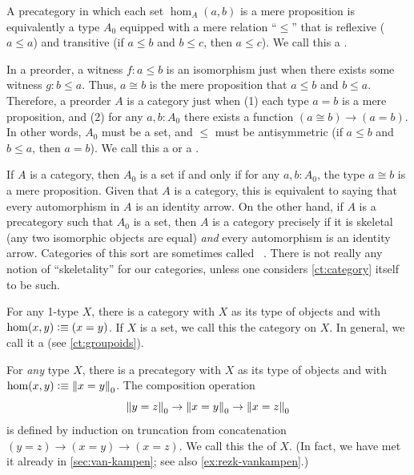 \begin{eg}\label{ct:orders}
  A precategory in which each set $\hom_A(a,b)$ is a mere proposition is equivalently a type $A_0$ equipped with a mere relation ``$\le$'' that is reflexive ($a\le a$) and transitive (if $a\le b$ and $b\le c$, then $a\le c$).
  We call this a .

  In a preorder, a witness $f: a\le b$ is an isomorphism just when there exists some witness $g: b\le a$.
  Thus, $a\cong b$ is the mere proposition that $a\le b$ and $b\le a$.
  Therefore, a preorder $A$ is a category just when (1) each type $a=b$ is a mere proposition, and (2) for any $a,b:A_0$ there exists a function $(a\cong b) \to (a=b)$.
  In other words, $A_0$ must be a set, and $\le$ must be antisymmetric (if $a\le b$ and $b\le a$, then $a=b$).
  We call this a  or a .
\end{eg}

\begin{eg}\label{ct:gaunt}
  If $A$ is a category, then $A_0$ is a set if and only if for any $a,b:A_0$, the type $a\cong b$ is a mere proposition.
  Given that $A$ is a category, this is equivalent to saying that every automorphism in $A$ is an identity arrow. On the other hand, if $A$ is a precategory such that $A_0$ is a set, then $A$ is a category precisely if it is skeletal (any two isomorphic objects are equal) \emph{and} every automorphism is an identity arrow.
  Categories of this sort are sometimes called ~\cite{bsp12infncats}.
  There is not really any notion of ``skeletality'' for our categories, unless one considers \cref{ct:category} itself to be such.
\end{eg}

\begin{eg}\label{ct:discrete}
  For any 1-type $X$, there is a category with $X$ as its type of objects and with $\hom(x,y) \vcentcolon\equiv (x=y)$.
  If $X$ is a set, we call this the 
  category on $X$.
  In general, we call it a 
  (see \cref{ct:groupoids}).
\end{eg}

\begin{eg}\label{ct:fundgpd}
  For \emph{any} type $X$, there is a precategory with $X$ as its type of objects and with $\hom(x,y) \vcentcolon\equiv \mathopen{}\left\Vert x=y\right\Vert_{0}\mathclose{}$.
  The composition operation
  \[ \mathopen{}\left\Vert y=z\right\Vert_{0}\mathclose{} \to \mathopen{}\left\Vert x=y\right\Vert_{0}\mathclose{} \to \mathopen{}\left\Vert x=z\right\Vert_{0}\mathclose{} \]
  is defined by induction on truncation from concatenation $(y=z)\to(x=y)\to(x=z)$.
  We call this the 
  of $X$.
  (In fact, we have met it already in \cref{sec:van-kampen}; see also \cref{ex:rezk-vankampen}.)
\end{eg}

